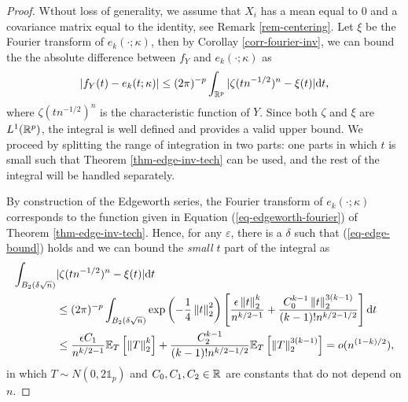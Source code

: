 \begin{proof}
    Wthout loss of generality, we assume that $X_i$ has a mean equal to 0 and a covariance matrix equal to the identity, see Remark \ref{rem-centering}. Let $\xi$ be the Fourier transform of $e_k(\cdot; \kappa)$, then by Corollay \ref{corr-fourier-inv}, we can bound the the absolute difference between $f_Y$ and $e_k(\cdot; \kappa)$ as
    \begin{equation*}
        |f_Y(t) - e_k(t; \kappa)| \leq (2\pi)^{-p}\intRp{t}{|\zeta(tn^{-1/2})^n - \xi(t)|},
    \end{equation*}
    where $\zeta(tn^{-1/2})^n$ is the characteristic function of $Y$. Since both $\zeta$ and $\xi$ are $L^1(\Rp)$, the integral is well defined and provides a valid upper bound. We proceed by splitting the range of integration in two parts: one parts in which $t$ is small such that Theorem \ref{thm-edge-inv-tech} can be used, and the rest of the integral will be handled separately.

    By construction of the Edgeworth series, the Fourier transform of $e_k(\cdot; \kappa)$ corresponds to the function given in Equation (\ref{eq-edgeworth-fourier}) of Theorem \ref{thm-edge-inv-tech}. Hence, for any $\varepsilon$, there is a $\delta$ such that (\ref{eq-edge-bound}) holds and we can bound the \textit{small $t$} part of the integral as
    \begin{align*}
        \int_{B_2(\delta\sqrt{n})} &|\zeta(tn^{-1/2})^n - \xi(t)| \d t\\
        &\leq (2\pi)^{-p}\int_{B_2(\delta\sqrt{n})}\expf{-\frac{1}{4}\norm{t}_2^2}\left[ \frac{\epsilon\norm{t}_2^k}{n^{k/2-1}} + \frac{C_0^{k-1}\norm{t}_2^{3(k-1)}}{(k-1)!n^{k/2-1/2}} \right] \d t \\
        &\leq \frac{\epsilon C_1}{n^{k/2-1}}\expec{T}{\norm{T}^k_2} + \frac{C_2^{k-1}}{(k-1)!n^{k/2-1/2}}\expec{T}{\norm{T}_2^{3(k-1)}}
        = o(n^{(1-k)/2}),
    \end{align*}
    in which $T \sim N(0, 2\mathbb{1}_p)$ and $C_0, C_1, C_2 \in \R$ are constants that do not depend on $n$. 


\end{proof}
